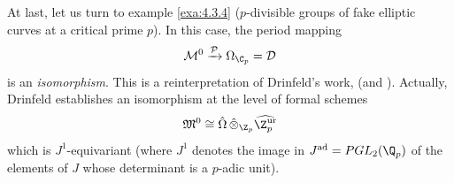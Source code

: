 \begin{para}\label{para:6.3.4}
 At last, let us turn to example \ref{exa:4.3.4} ($p$-divisible groups of fake
 elliptic curves at a critical prime $p$). In this case, the period mapping 
 \begin{equation*}
  \mathcal{M}^0 \xrightarrow{\mathcal{P}}\Omega_{\C_p} =\mathcal{D}
 \end{equation*}
 is an {\it isomorphism}. This is a reinterpretation
 of Drinfeld's work, \cf \cite{psfpg} (and \cite[II8]{updcds}). Actually,
 Drinfeld establishes an isomorphism at the level of formal schemes 
 \begin{equation*}
  {\mathfrak{M}}^0 \cong \hat{\Omega}\,
  \hat\otimes_{\Z_p}\widehat{\Z_p^{\mathrm{ur}}}
 \end{equation*}
 which is $J^1$-equivariant (where $J^1$ denotes the
 image in $J^{\mathrm{ad}}=PGL_2(\Q_p)$ of the elements of $J$ whose
 determinant is a $p$-adic unit).
\end{para}

